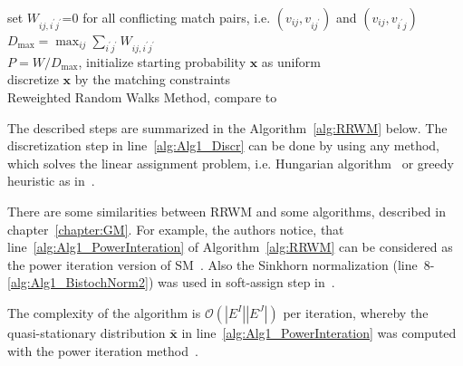 \begin{algorithm}[t] 
	set $W_{ij,i^\prime j^\prime}$=0 for all conflicting match pairs, i.e. $(v_{ij},v_{ij^\prime})$ and $(v_{ij},v_{i^\prime j})$ \\
	$D_{\text{max}}=\max_{ij}\sum_{i^\prime j^\prime}W_{ij,i^\prime j^\prime}$ \\
	$P=W/D_{\text{max}}$, initialize starting probability $\mathbf{x}$ as uniform\\
	discretize $\mathbf{x}$ by the matching constraints \label{alg:Alg1_Discr} \\
	\caption{Reweighted Random Walks Method, compare to~\cite{Cho2010_RRWM}}    
	\label{alg:RRWM}
\end{algorithm}

The described steps are summarized in the Algorithm~\ref{alg:RRWM} below. The discretization step in line~\ref{alg:Alg1_Discr} can be done by using any method, which solves the linear assignment problem, i.e. Hungarian algorithm~\cite{Kuhn1955} or greedy heuristic as in~\cite{Leordeanu2005_SM}.

There are some similarities between RRWM and some algorithms, described in chapter~\ref{chapter:GM}. For example, the authors notice, that line~\ref{alg:Alg1_PowerInteration} of Algorithm~\ref{alg:RRWM} can be considered as the power iteration version of SM~\cite{Leordeanu2005_SM}. Also the Sinkhorn normalization (line~8-\ref{alg:Alg1_BistochNorm2}) was used in soft-assign step in~\cite{Rangarajan1996_GAGM}. 


The complexity of the algorithm is $\mathcal{O}(|E^I||E^J|)$ per iteration, whereby the quasi-stationary distribution $\mathbf{\bar{x}}$ in line~\ref{alg:Alg1_PowerInteration} was computed with the power iteration method~\cite{PowerIteration}.

